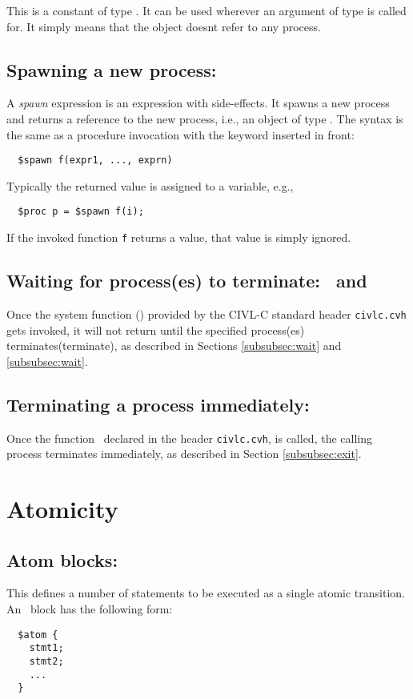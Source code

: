 This is a constant of type \cproc. It can be used wherever an argument
of type \cproc{} is called for. It simply means that the object doesnt refer to any process.

\subsection{Spawning a new process: \cspawn}

A \emph{spawn} expression is an expression with side-effects.  It
spawns a new process and returns a reference to the new process, i.e.,
an object of type \cproc.  The syntax is the same as a procedure
invocation with the keyword \cspawn{} inserted in front:
\begin{verbatim}
  $spawn f(expr1, ..., exprn)
\end{verbatim}
Typically the returned value is assigned to a variable, e.g.,
\begin{verbatim}
  $proc p = $spawn f(i);
\end{verbatim}
If the invoked function \texttt{f} returns a value, that value is
simply ignored.

\subsection{Waiting for process(es) to terminate: \cwait\ and \cwaitall}

Once the system function \cwait(\cwaitall) provided by the CIVL-C standard header \texttt{civlc.cvh} 
gets invoked, it will not return until the specified process(es) terminates(terminate), as described in Sections \ref{subsubsec:wait} and
\ref{subsubsec:wait}.

\subsection{Terminating a process immediately: \cexit}
Once the function \cexit\, declared in the header \texttt{civlc.cvh}, is called, the calling process terminates immediately, as described in Section \ref{subsubsec:exit}.

\section{Atomicity}

\subsection{Atom blocks: \catom} This defines a number of statements
to be executed as a single atomic transition.  An \catom~block has the
following form:
\begin{verbatim}
  $atom {
    stmt1;
    stmt2;
    ...
  }
\end{verbatim}

